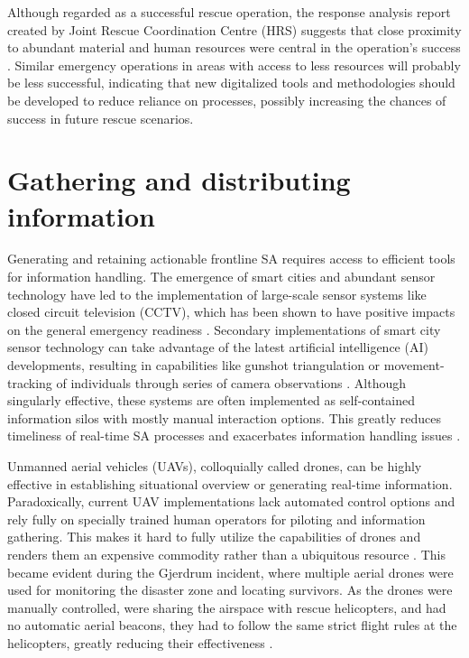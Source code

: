 Although regarded as a successful rescue operation, the response analysis report created by Joint Rescue Coordination Centre (HRS) suggests that close proximity to abundant material and human resources were central in the operation’s success \cite{halvorsen_evalueringsrapport_2021}. Similar emergency operations in areas with access to less resources will probably be less successful, indicating that new digitalized tools and methodologies should be developed to reduce reliance on processes, possibly increasing the chances of success in future rescue scenarios. 

\section{Gathering and distributing information}
Generating and retaining actionable frontline SA requires access to efficient tools for information handling. The emergence of smart cities and abundant sensor technology have led to the implementation of large-scale sensor systems like closed circuit television (CCTV), which has been shown to have positive impacts on the general emergency readiness \cite{thomas_internationalisation_2022}. Secondary implementations of smart city sensor technology can take advantage of the latest artificial intelligence (AI) developments, resulting in capabilities like gunshot triangulation or movement-tracking of individuals through series of camera observations \cite{arai_smart_2020}. Although singularly effective, these systems are often implemented as self-contained information silos with mostly manual interaction options. This greatly reduces timeliness of real-time SA processes and exacerbates information handling issues \cite{thomas_internationalisation_2022}.
 
Unmanned aerial vehicles (UAVs), colloquially called drones, can be highly effective in establishing situational overview or generating real-time information. Paradoxically, current UAV implementations lack automated control options and rely fully on specially trained human operators for piloting and information gathering. This makes it hard to fully utilize the capabilities of drones and renders them an expensive commodity rather than a ubiquitous resource \cite{arai_smart_2020}. This became evident during the Gjerdrum incident, where multiple aerial drones were used for monitoring the disaster zone and locating survivors. As the drones were manually controlled, were sharing the airspace with rescue helicopters, and had no automatic aerial beacons, they had to follow the same strict flight rules at the helicopters, greatly reducing their effectiveness \cite{halvorsen_evalueringsrapport_2021}.
